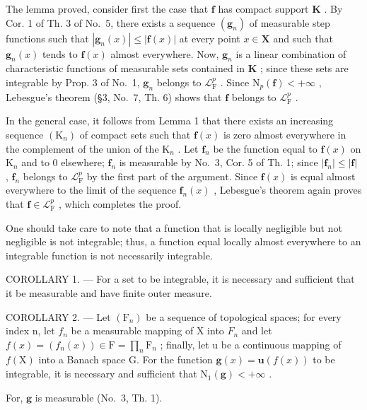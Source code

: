 The lemma proved, consider first the case that \(\mathbf{f}\) has compact support \(\mathbf{K}\) . By Cor. 1 of Th. 3 of No.~5, there exists a sequence \((\mathbf{g}_n)\) of measurable step functions such that \(|\mathbf{g}_n(x)| \leqslant |\mathbf{f}(x)|\) at every point \(x \in \mathbf{X}\) and such that \(\mathbf{g}_n(x)\) tends to \(\mathbf{f}(x)\) almost everywhere. Now, \(\mathbf{g}_n\) is a linear combination of characteristic functions of measurable sets contained in \(\mathbf{K}\) ; since these sets are integrable by Prop. 3 of No.~1, \(\mathbf{g}_n\) belongs to \(\mathcal{L}_{\mathrm{F}}^p\) . Since \(\mathrm{N}_p(\mathbf{f}) < +\infty\) , Lebesgue's theorem (§3, No.~7, Th. 6) shows that \(\mathbf{f}\) belongs to \(\mathcal{L}_{\mathrm{F}}^p\) .

In the general case, it follows from Lemma 1 that there exists an increasing sequence \((\mathrm{K}_n)\) of compact sets such that \(\mathbf{f}(x)\) is zero almost everywhere in the complement of the union of the \(\mathrm{K}_n\) . Let \(\mathbf{f}_n\) be the function equal to \(\mathbf{f}(x)\) on \(\mathrm{K}_n\) and to 0 elsewhere; \(\mathbf{f}_n\) is measurable by No.~3, Cor. 5 of Th. 1; since \(|\mathbf{f}_n| \leqslant |\mathbf{f}|\) , \(\mathbf{f}_n\) belongs to \(\mathcal{L}_{\mathrm{F}}^p\) by the first part of the argument. Since \(\mathbf{f}(x)\) is equal almost everywhere to the limit of the sequence \(\mathbf{f}_n(x)\) , Lebesgue's theorem again proves that \(\mathbf{f} \in \mathcal{L}_{\mathrm{F}}^p\) , which completes the proof.

One should take care to note that a function that is locally negligible but not negligible is not integrable; thus, a function equal locally almost everywhere to an integrable function is not necessarily integrable.

COROLLARY 1. --- For a set to be integrable, it is necessary and sufficient that it be measurable and have finite outer measure.

COROLLARY 2. --- Let \((\mathrm{F}_{n})\) be a sequence of topological spaces; for every index n, let \(f_{n}\) be a measurable mapping of X into \(F_{n}\) and let \(f(x) = (f_{n}(x)) \in \mathrm{F} = \prod_{n} \mathrm{F}_{n}\) ; finally, let u be a continuous mapping of \(f(\mathrm{X})\) into a Banach space G. For the function \(\mathbf{g}(x) = \mathbf{u}(f(x))\) to be integrable, it is necessary and sufficient that \(\mathrm{N}_{1}(\mathbf{g}) < +\infty\) .

For, \(\mathbf{g}\) is measurable (No.~3, Th. 1).

